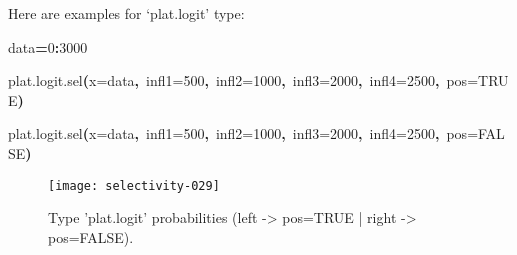 \documentclass[letterpaper, 12pt]{article}
\newenvironment{Hinput}%
{}%
{}%
\newenvironment{Hchunk}%
{\vspace{0.5em}\par\begin{flushleft}}%
{\end{flushleft}}%
\newcommand{\hlnumber}[1]{\textcolor[rgb]{0.0823529411764706,0.0784313725490196,0.709803921568627}{#1}}%
\newcommand{\hlfunctioncall}[1]{\textcolor[rgb]{1,0,0}{#1}}%
\newcommand{\hlkeyword}[1]{\textcolor[rgb]{0,0,0}{\textbf{#1}}}%
\newcommand{\hlargument}[1]{\textcolor[rgb]{0.694117647058824,0.247058823529412,0.0196078431372549}{#1}}%
\newcommand{\hlassignement}[1]{\textcolor[rgb]{0.215686274509804,0.215686274509804,0.384313725490196}{\textbf{#1}}}%
\newcommand{\hlsymbol}[1]{\textcolor[rgb]{0,0,0}{#1}}%
\newcommand{\hlprompt}[1]{\textcolor[rgb]{0,0,0}{#1}}%
\begin{document}
Here are examples for `plat.logit' type:
\begin{Hchunk}
\begin{normalsize}
\begin{Hinput}
\ttfamily\noindent
\hlprompt{\usebox{\hlnormalsizeboxgreaterthan}{\ }}\hlsymbol{data}\hlassignement{=}\hlnumber{0}\hlkeyword{:}\hlnumber{3000}\mbox{}
\normalfont
\end{Hinput}


\begin{Hinput}
\ttfamily\noindent
\hlprompt{\usebox{\hlnormalsizeboxgreaterthan}{\ }}\hlfunctioncall{plat.logit.sel}\hlkeyword{(}\hlargument{x}\hlargument{=}\hlsymbol{data}\hlkeyword{,}{\ }\hlargument{infl1}\hlargument{=}\hlnumber{500}\hlkeyword{,}{\ }\hlargument{infl2}\hlargument{=}\hlnumber{1000}\hlkeyword{,}{\ }\hlargument{infl3}\hlargument{=}\hlnumber{2000}\hlkeyword{,}{\ }\hlargument{infl4}\hlargument{=}\hlnumber{2500}\hlkeyword{,}{\ }\hlargument{pos}\hlargument{=}\hlnumber{TRUE}\hlkeyword{)}\mbox{}
\normalfont
\end{Hinput}


\begin{Hinput}
\ttfamily\noindent
\hlprompt{\usebox{\hlnormalsizeboxgreaterthan}{\ }}\hlfunctioncall{plat.logit.sel}\hlkeyword{(}\hlargument{x}\hlargument{=}\hlsymbol{data}\hlkeyword{,}{\ }\hlargument{infl1}\hlargument{=}\hlnumber{500}\hlkeyword{,}{\ }\hlargument{infl2}\hlargument{=}\hlnumber{1000}\hlkeyword{,}{\ }\hlargument{infl3}\hlargument{=}\hlnumber{2000}\hlkeyword{,}{\ }\hlargument{infl4}\hlargument{=}\hlnumber{2500}\hlkeyword{,}{\ }\hlargument{pos}\hlargument{=}\hlnumber{FALSE}\hlkeyword{)}\mbox{}
\normalfont
\end{Hinput}


\end{normalsize}
\end{Hchunk}

\begin{figure}[h]
\vspace{-20pt}
\begin{center}
\texttt{[image: selectivity-029]}
\end{center}
\vspace{-30pt}
\caption{Type 'plat.logit' probabilities (left -> pos=TRUE |  right -> pos=FALSE).}
\vspace{-10pt}
\label{fig14}
\end{figure}
\end{document}
